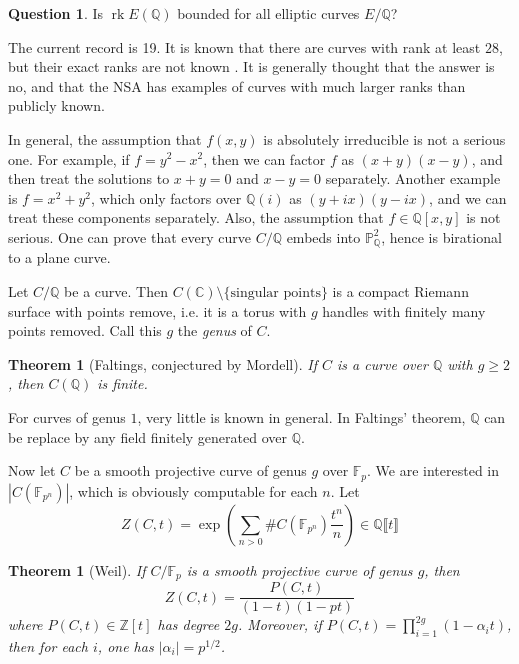 \documentclass{article}
\newtheorem{theorem}[subsection]{Theorem}
\theoremstyle{definition}
\newtheorem{question}[subsection]{Question}
\begin{document}
\begin{question}
Is $\operatorname{rk} E(\mathbb{Q})$ bounded for all elliptic curves 
$E/\mathbb{Q}$?
\end{question}

The current record is 19. It is known that there are curves with rank at least 
$28$, but their exact ranks are not known \cite{du}. It is generally thought 
that the answer is no, and that the NSA has examples of curves with much 
larger ranks than publicly known. 

In general, the assumption that $f(x,y)$ is absolutely irreducible is not a 
serious one. For example, if $f=y^2-x^2$, then we can factor $f$ as 
$(x+y)(x-y)$, and then treat the solutions to $x+y=0$ and $x-y=0$ separately. 
Another example is $f=x^2+y^2$, which only factors over $\mathbb{Q}(i)$ as 
$(y+i x)(y-i x)$, and we can treat these components separately. Also, the 
assumption that $f\in \mathbb{Q}[x,y]$ is not serious. One can prove that 
every curve $C/\mathbb{Q}$ embeds into $\mathbb{P}^2_\mathbb{Q}$, hence is 
birational to a plane curve. 

Let $C/\mathbb{Q}$ be a curve. Then 
$C(\mathbb{C})\setminus \{\text{singular points}\}$ is a compact Riemann 
surface with points remove, i.e. it is a torus with $g$ handles with finitely 
many points removed. Call this $g$ the \emph{genus} of $C$. 

\begin{theorem}[Faltings, conjectured by Mordell]
If $C$ is a curve over $\mathbb{Q}$ with $g\geqslant 2$, then $C(\mathbb{Q})$ 
is finite. 
\end{theorem}

For curves of genus $1$, very little is known in general. In Faltings' 
theorem, $\mathbb{Q}$ can be replace by any field finitely generated over 
$\mathbb{Q}$. 

Now let $C$ be a smooth projective curve of genus $g$ over $\mathbb{F}_p$. 
We are interested in $|C(\mathbb{F}_{p^n})|$, which is obviously computable 
for each $n$. Let 
\[
  Z(C,t) = \exp\left( \sum_{n>0} \# C(\mathbb{F}_{p^n}) \frac{t^n}{n} \right) \in \mathbb{Q}\llbracket t\rrbracket 
\]

\begin{theorem}[Weil]
If $C/\mathbb{F}_p$ is a smooth projective curve of genus $g$, then 
\[
  Z(C,t) = \frac{P(C,t)}{(1-t)(1-p t)}
\]
where $P(C,t)\in \mathbb{Z}[t]$ has degree $2 g$. Moreover, if 
$P(C,t) = \prod_{i=1}^{2 g} (1-\alpha_i t)$, then for each $i$, one has 
$|\alpha_i|=p^{1/2}$. 
\end{theorem}
\end{document}
